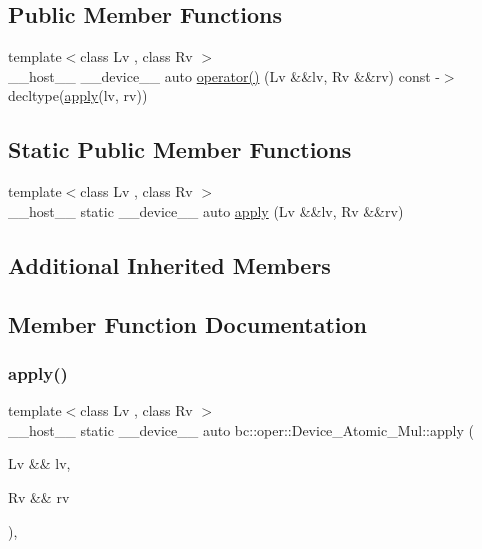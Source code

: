 \subsection*{Public Member Functions}
\begin{DoxyCompactItemize}
\item 
{\footnotesize template$<$class Lv , class Rv $>$ }\\\+\_\+\+\_\+host\+\_\+\+\_\+ \+\_\+\+\_\+device\+\_\+\+\_\+ auto \hyperlink{structbc_1_1oper_1_1Device__Atomic__Mul_a570bce5f63941d93f759c4426713d849}{operator()} (Lv \&\&lv, Rv \&\&rv) const -\/$>$ decltype(\hyperlink{structbc_1_1oper_1_1Device__Atomic__Mul_a6706742cf823f213808395c4449e62d8}{apply}(lv, rv))
\end{DoxyCompactItemize}
\subsection*{Static Public Member Functions}
\begin{DoxyCompactItemize}
\item 
{\footnotesize template$<$class Lv , class Rv $>$ }\\\+\_\+\+\_\+host\+\_\+\+\_\+ static \+\_\+\+\_\+device\+\_\+\+\_\+ auto \hyperlink{structbc_1_1oper_1_1Device__Atomic__Mul_a6706742cf823f213808395c4449e62d8}{apply} (Lv \&\&lv, Rv \&\&rv)
\end{DoxyCompactItemize}
\subsection*{Additional Inherited Members}


\subsection{Member Function Documentation}
\mbox{\label{structbc_1_1oper_1_1Device__Atomic__Mul_a6706742cf823f213808395c4449e62d8}} 
\subsubsection{\texorpdfstring{apply()}{apply()}}
{\footnotesize\ttfamily template$<$class Lv , class Rv $>$ \\
\+\_\+\+\_\+host\+\_\+\+\_\+ static \+\_\+\+\_\+device\+\_\+\+\_\+ auto bc\+::oper\+::\+Device\+\_\+\+Atomic\+\_\+\+Mul\+::apply (\begin{DoxyParamCaption}\item[{Lv \&\&}]{lv,  }\item[{Rv \&\&}]{rv }\end{DoxyParamCaption})\hspace{0.3cm}{\ttfamily [inline]}, {\ttfamily [static]}}


